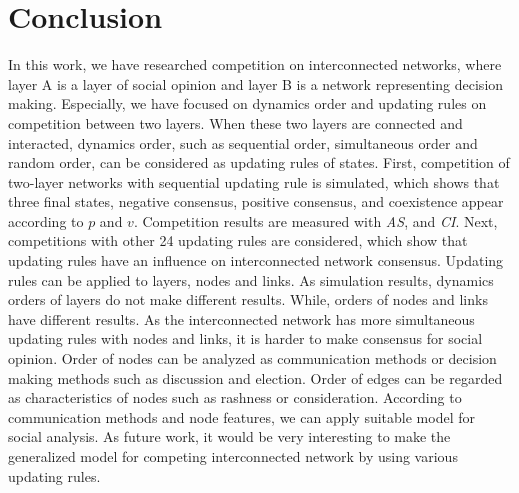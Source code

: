 \documentclass[review]{elsarticle}
\begin{document}
\section{Conclusion}
In this work, we have researched competition on interconnected networks, where layer A is a layer of social opinion and layer B is a network representing decision making.  Especially, we have focused on dynamics order and updating rules on competition between two layers. When these two layers are connected and interacted, dynamics order, such as sequential order, simultaneous order and random order, can be considered as updating rules of states. 
First, competition of two-layer networks with sequential updating rule is simulated, which shows that three final states, negative consensus, positive consensus, and coexistence appear according to $p$ and $v$. Competition results are measured with \textit{AS}, and \textit{CI}. Next, competitions with other 24 updating rules are considered, which show that updating rules have an influence on interconnected network consensus. Updating rules can be applied to layers, nodes and links. As simulation results, dynamics orders of layers do not make different results. While, orders of nodes and links have different results. As the interconnected network has more simultaneous updating rules with nodes and links, it is harder to make consensus for social opinion. Order of nodes can be analyzed as communication methods or decision making methods such as discussion and election. Order of edges can be regarded as characteristics of nodes such as rashness or consideration. According to communication methods and node features, we can apply suitable model for social analysis. 
As future work, it would be very interesting to make the generalized model for competing interconnected network by using various updating rules. 


\end{document}
